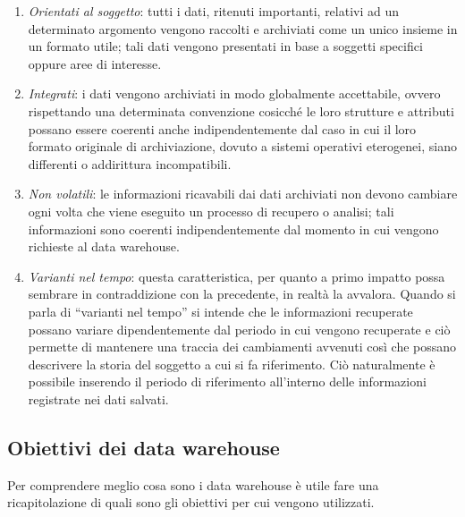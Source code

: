 \begin{enumerate}
    \item \textit{Orientati al soggetto}: tutti i dati, ritenuti importanti, relativi ad un determinato argomento vengono raccolti e archiviati come un unico insieme in un formato utile; tali dati vengono presentati in base a soggetti specifici oppure aree di interesse.
    \item \textit{Integrati}: i dati vengono archiviati in modo globalmente accettabile, ovvero rispettando una determinata convenzione cosicché le loro strutture e attributi possano essere coerenti anche indipendentemente dal caso in cui il loro formato originale di archiviazione, dovuto a sistemi operativi eterogenei, siano differenti o addirittura incompatibili.
    \item \textit{Non volatili}: le informazioni ricavabili dai dati archiviati non devono cambiare ogni volta che viene eseguito un processo di recupero o analisi; tali informazioni sono coerenti indipendentemente dal momento in cui vengono richieste al data warehouse.
    \item \textit{Varianti nel tempo}: questa caratteristica, per quanto a primo impatto possa sembrare in contraddizione con la precedente, in realtà la avvalora. Quando si parla di “varianti nel tempo” si intende che le informazioni recuperate possano variare dipendentemente dal periodo in cui vengono recuperate e ciò permette di mantenere una traccia dei cambiamenti avvenuti così che possano descrivere la storia del soggetto a cui si fa riferimento. Ciò naturalmente è possibile inserendo il periodo di riferimento all’interno delle informazioni registrate nei dati salvati.
\end{enumerate}

\subsection{Obiettivi dei data warehouse}
Per comprendere meglio cosa sono i data warehouse è utile fare una ricapitolazione di quali sono gli obiettivi per cui vengono utilizzati.\cite{kimball_the_data_warehouse_toolkit}

